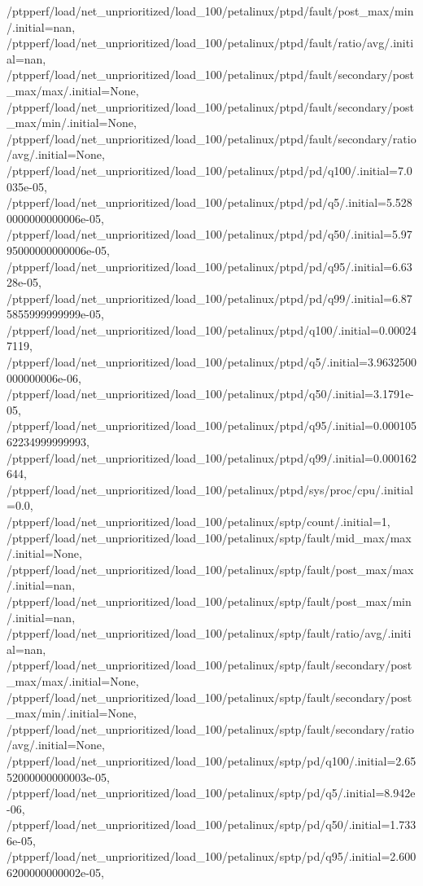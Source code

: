 {    /ptpperf/load/net_unprioritized/load_100/petalinux/ptpd/fault/post_max/min/.initial=nan,
    /ptpperf/load/net_unprioritized/load_100/petalinux/ptpd/fault/ratio/avg/.initial=nan,
    /ptpperf/load/net_unprioritized/load_100/petalinux/ptpd/fault/secondary/post_max/max/.initial=None,
    /ptpperf/load/net_unprioritized/load_100/petalinux/ptpd/fault/secondary/post_max/min/.initial=None,
    /ptpperf/load/net_unprioritized/load_100/petalinux/ptpd/fault/secondary/ratio/avg/.initial=None,
    /ptpperf/load/net_unprioritized/load_100/petalinux/ptpd/pd/q100/.initial=7.0035e-05,
    /ptpperf/load/net_unprioritized/load_100/petalinux/ptpd/pd/q5/.initial=5.5280000000000006e-05,
    /ptpperf/load/net_unprioritized/load_100/petalinux/ptpd/pd/q50/.initial=5.9795000000000006e-05,
    /ptpperf/load/net_unprioritized/load_100/petalinux/ptpd/pd/q95/.initial=6.6328e-05,
    /ptpperf/load/net_unprioritized/load_100/petalinux/ptpd/pd/q99/.initial=6.875855999999999e-05,
    /ptpperf/load/net_unprioritized/load_100/petalinux/ptpd/q100/.initial=0.000247119,
    /ptpperf/load/net_unprioritized/load_100/petalinux/ptpd/q5/.initial=3.9632500000000006e-06,
    /ptpperf/load/net_unprioritized/load_100/petalinux/ptpd/q50/.initial=3.1791e-05,
    /ptpperf/load/net_unprioritized/load_100/petalinux/ptpd/q95/.initial=0.00010562234999999993,
    /ptpperf/load/net_unprioritized/load_100/petalinux/ptpd/q99/.initial=0.000162644,
    /ptpperf/load/net_unprioritized/load_100/petalinux/ptpd/sys/proc/cpu/.initial=0.0,
    /ptpperf/load/net_unprioritized/load_100/petalinux/sptp/count/.initial=1,
    /ptpperf/load/net_unprioritized/load_100/petalinux/sptp/fault/mid_max/max/.initial=None,
    /ptpperf/load/net_unprioritized/load_100/petalinux/sptp/fault/post_max/max/.initial=nan,
    /ptpperf/load/net_unprioritized/load_100/petalinux/sptp/fault/post_max/min/.initial=nan,
    /ptpperf/load/net_unprioritized/load_100/petalinux/sptp/fault/ratio/avg/.initial=nan,
    /ptpperf/load/net_unprioritized/load_100/petalinux/sptp/fault/secondary/post_max/max/.initial=None,
    /ptpperf/load/net_unprioritized/load_100/petalinux/sptp/fault/secondary/post_max/min/.initial=None,
    /ptpperf/load/net_unprioritized/load_100/petalinux/sptp/fault/secondary/ratio/avg/.initial=None,
    /ptpperf/load/net_unprioritized/load_100/petalinux/sptp/pd/q100/.initial=2.6552000000000003e-05,
    /ptpperf/load/net_unprioritized/load_100/petalinux/sptp/pd/q5/.initial=8.942e-06,
    /ptpperf/load/net_unprioritized/load_100/petalinux/sptp/pd/q50/.initial=1.7336e-05,
    /ptpperf/load/net_unprioritized/load_100/petalinux/sptp/pd/q95/.initial=2.6006200000000002e-05,
}
